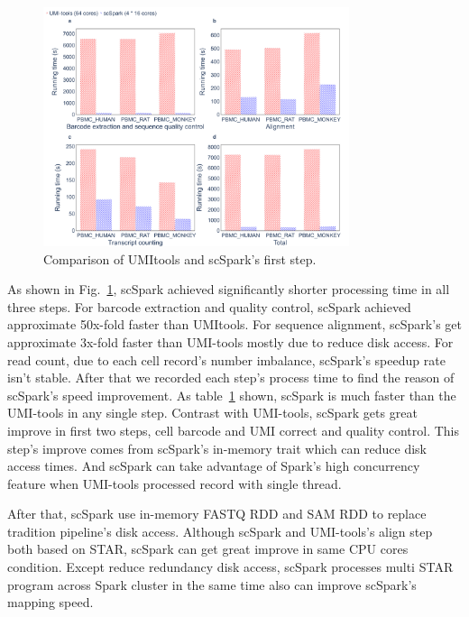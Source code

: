 \documentclass[conference]{IEEEtran}
\begin{document}

\begin{figure}
	\includegraphics[width=0.8\textwidth]{Fig4.pdf}
	\caption{Comparison of UMI\-tools and scSpark's first step.} \label{fig4}
\end{figure}

As shown in Fig.~\ref{fig4}, scSpark achieved significantly shorter processing time in all three steps. 
For barcode extraction and quality control, scSpark achieved approximate 50x-fold faster than UMI\-tools.
For sequence alignment, scSpark's get approximate 3x-fold faster than UMI-tools mostly due to reduce disk access.
For read count, due to each cell record's number imbalance, scSpark's speedup rate isn't stable.
\iffalse
After that we recorded each step's process time to find the reason of scSpark's speed improvement.
As table~\ref{fig4} shown, scSpark is much faster than the UMI-tools in any single step.
Contrast with UMI-tools, scSpark gets great improve in first two steps, cell barcode and UMI correct and quality control.
This step's improve comes from scSpark's in-memory trait which can reduce disk access times.
And scSpark can take advantage of Spark's high concurrency feature when UMI-tools processed record with single thread.

After that, scSpark use in-memory FASTQ RDD and SAM RDD to replace tradition pipeline's disk access. 
Although scSpark and UMI-tools's align step both based on STAR, scSpark can get great improve in same CPU cores condition.
Except reduce redundancy disk access, scSpark processes multi STAR program across Spark cluster in the same time also can improve scSpark's mapping speed.
\end{document}
